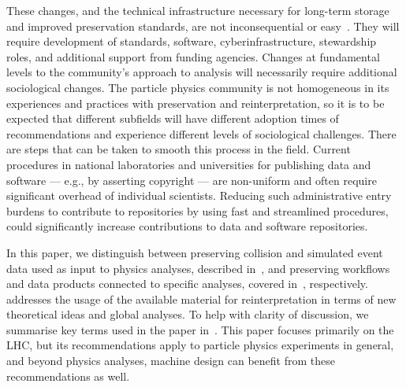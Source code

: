 \documentclass[11pt]{article}
\begin{document}
These changes, and the technical infrastructure necessary for long-term storage and improved preservation standards, are not inconsequential or easy~\cite{LHCReinterpretationForum:2020xtr,Cranmer:2021urp}.
They will require development of standards, software, cyberinfrastructure, stewardship roles, and additional support from funding agencies.
Changes at fundamental levels to the community's approach to analysis will necessarily require additional sociological changes.
The particle physics community is not homogeneous in its experiences and practices with preservation and reinterpretation, so it is to be expected that different subfields will have different adoption times of recommendations and experience different levels of sociological challenges.
There are steps that can be taken to smooth this process in the field.
%
Current procedures in national laboratories and universities for publishing data and software --- e.g., by asserting copyright --- are non-uniform and often require significant overhead of individual scientists.
Reducing such administrative entry burdens to contribute to repositories by using fast and streamlined procedures,
could significantly increase contributions to data and software repositories.

In this paper, we distinguish between preserving collision and simulated event data used as input to physics analyses, described in~, and preserving workflows and data products connected to specific analyses, covered in~, respectively.  addresses the usage of the available material for reinterpretation in terms of new theoretical ideas and global analyses.
To help with clarity of discussion, we summarise key terms used in the paper in~.
This paper focuses primarily on the \gls{LHC}, but its recommendations apply to particle physics experiments in general, and beyond physics analyses, machine design can benefit from these recommendations as well.
\end{document}
